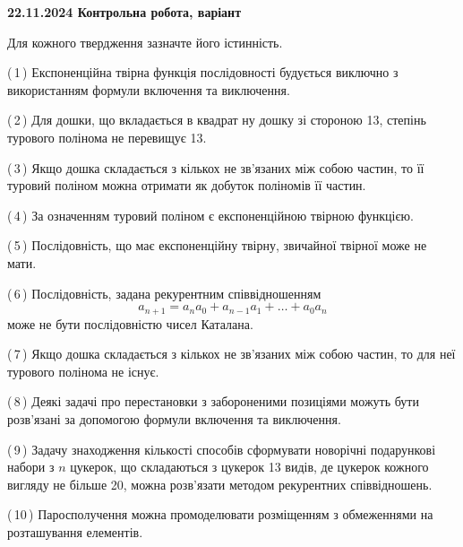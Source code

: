 \documentclass[12pt, ukrainian]{article}
\begin{document}
\begin {large}
\begin {large}
\begin {large}
\begin {large}
\begin {large}
\begin {large}
\begin {large}
\begin {large}
\begin {large}
\begin {large}
\begin {large}
\begin {large}
\begin {large}
\begin {large}
\begin {large}
\begin {large}
\begin {large}
\begin {large}
\begin {large}
\begin {large}
\begin {large}
\begin {large}
\begin {large}
\begin {large}

\textbf{22.11.2024 Контрольна робота, варіант  }\par


{
Для кожного твердження зазначте його істинність.\par

\vspace{2mm}

(\,1\,) Експоненційна твірна функція послідовності будується виключно з використанням формули включення та виключення.%



(\,2\,) Для дошки, що вкладається в квадрат ну дошку зі стороною 13, степінь турового полінома не перевищує 13.%



(\,3\,) Якщо дошка складається з кількох не зв’язаних між собою частин, то її туровий поліном можна отримати як добуток поліномів її частин.%



(\,4\,) За означенням туровий поліном є експоненційною твірною функцією.%



(\,5\,) Послідовність, що має експоненційну твірну, звичайної твірної може не мати.%



(\,6\,) Послідовність, задана рекурентним співвідношенням $$a_{n+1}=a_{n}a_{0}+a_{n-1}a_{1}+\ldots+a_0a_{n}$$ може не бути послідовністю чисел Каталана.%



(\,7\,) Якщо дошка складається з кількох не зв’язаних між собою частин, то для неї турового полінома не існує.%



(\,8\,) Деякі задачі про перестановки з забороненими позиціями можуть бути розв’я\-за\-ні за допомогою формули включення та виключення.%



(\,9\,) Задачу знаходження кількості способів сформувати новорічні подарункові набори з $n$ цукерок, що складаються з цукерок 13 видів, де цукерок кожного вигляду не більше 20, можна розв’язати методом рекурентних співвідношень.%



(\,10\,) Паросполучення можна промоделювати розміщенням з обмеженнями на розташування елементів.%




}
\end{large}
\end{large}
\end{large}
\end{large}
\end{large}
\end{large}
\end{large}
\end{large}
\end{large}
\end{large}
\end{large}
\end{large}
\end{large}
\end{large}
\end{large}
\end{large}
\end{large}
\end{large}
\end{large}
\end{large}
\end{large}
\end{large}
\end{large}
\end{large}
\end{document}
